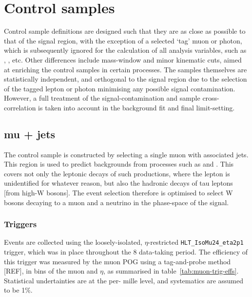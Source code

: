 \section{Control samples}  %
\label{sec:background_control}

Control sample definitions are designed such that they are as close as possible 
to that of the signal region, with the exception of a selected `tag' muon or 
photon, which is subsequently ignored for the calculation of all analysis 
variables, such as \HT, \met, \alphat etc. Other differences include mass-window
and minor kinematic cuts, aimed at enriching the control samples in certain processes. 
The samples themselves are statistically independent, and orthogonal to the 
signal region due to the selection of the tagged lepton or photon minimising any 
possible signal contamination. However, a full treatment of the
signal-contamination and sample cross-correlation is taken into account in the
background fit and final limit-setting. 


\subsection{mu + jets}

The \mj control sample is constructed by selecting a single muon with associated 
jets. This region is used to predict backgrounds from processes such as \wj and
\ttj. This covers not only the leptonic decays of such productions, where the 
lepton is unidentified for whatever reason, but also the hadronic decays of tau 
leptons [from high-\Pt W bosons]. The event selection therefore is optimised to 
select W bosons decaying to a muon and a neutrino in the phase-space of the 
signal.

\subsubsection{Triggers}
\label{sec:mujets_control_trigger}
Events are collected using the loosely-isolated, $\eta$-restricted
\verb!HLT_IsoMu24_eta2p1! trigger, which was in place throughout the 8\tev
data-taking period. The efficiency of this trigger was measured by the muon POG 
using a tag-and-probe method [REF], in bins of the muon \Pt and $\eta$, as summarised 
in table~\ref{tab:muon-trig-effs}. Statistical undertainties are at the per-
mille level, and systematics are assumed to be 1\%.

